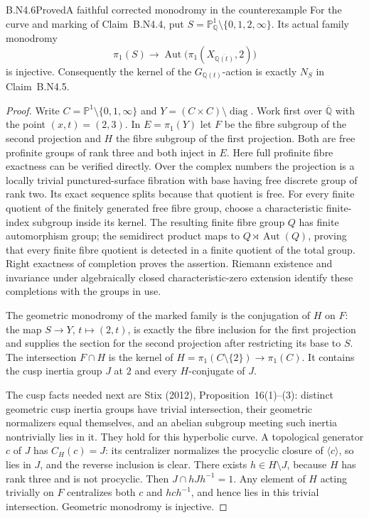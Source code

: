 \begin{claim}{B.N4.6}{Proved}{A faithful corrected monodromy in the counterexample}
For the curve and marking of Claim~B.N4.4, put
$S=\mathbb P^1_{\mathbb Q}\setminus\{0,1,2,\infty\}$.
Its actual family monodromy
\[
 \pi_1(S)\longrightarrow
 \operatorname{Aut}\bigl(\pi_1(X_{\overline{\mathbb Q(t)}},2)\bigr)
\]
is injective.  Consequently the kernel of the $G_{\mathbb Q(t)}$-action
is exactly $N_S$ in Claim~B.N4.5.
\end{claim}
\begin{proof}
Write $C=\mathbb P^1\setminus\{0,1,\infty\}$ and
$Y=(C\times C)\setminus\operatorname{diag}$.  Work first over
$\overline{\mathbb Q}$ with the point $(x,t)=(2,3)$.  In
$E=\pi_1(Y)$ let $F$ be the fibre subgroup of the second projection
and $H$ the fibre subgroup of the first projection.  Both are free
profinite groups of rank three and both inject in $E$.  Here full
profinite fibre exactness can be verified directly.  Over the complex
numbers the projection is a locally trivial punctured-surface fibration
with base having free discrete group of rank two.  Its exact sequence
splits because that quotient is free.  For every finite quotient of
the finitely generated free fibre group, choose a characteristic
finite-index subgroup inside its kernel.  The resulting finite fibre
group $Q$ has finite automorphism group; the semidirect product maps
to $Q\rtimes\operatorname{Aut}(Q)$, proving that every finite fibre
quotient is detected in a finite quotient of the total group.  Right
exactness of completion proves the assertion.  Riemann existence and
invariance under algebraically closed characteristic-zero extension
identify these completions with the groups in use.

The geometric monodromy of the marked family is the conjugation of
$H$ on $F$: the map $S\to Y$, $t\mapsto(2,t)$, is exactly the fibre
inclusion for the first projection and supplies the section for the
second projection after restricting its base to $S$.  The intersection
$F\cap H$ is the kernel of
$H=\pi_1(C\setminus\{2\})\to\pi_1(C)$.  It contains the cusp
inertia group $J$ at $2$ and every $H$-conjugate of $J$.

The cusp facts needed next are Stix (2012), Proposition~16(1)--(3):
distinct geometric cusp inertia groups have trivial intersection,
their geometric normalizers equal themselves, and an abelian subgroup
meeting such inertia nontrivially lies in it.  They hold for this
hyperbolic curve.  A topological generator $c$ of $J$ has
$C_H(c)=J$: its centralizer normalizes the procyclic closure of
$\langle c\rangle$, so lies in $J$, and the reverse inclusion is clear.
There exists $h\in H\setminus J$, because $H$ has rank three and is
not procyclic.  Then $J\cap hJh^{-1}=1$.  Any element of $H$ acting
trivially on $F$ centralizes both $c$ and $hch^{-1}$, and hence lies in
this trivial intersection.  Geometric monodromy is injective.


\end{proof}
